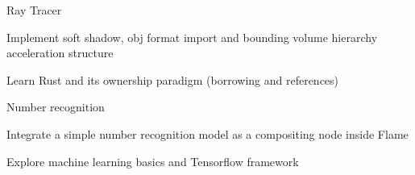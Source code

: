 




\begin{cventries}


\cvproj
{Ray Tracer} %
{ %
\begin{cvitems}
\item {Implement soft shadow, obj format import and bounding volume hierarchy acceleration structure }
\item {Learn Rust and its ownership paradigm (borrowing and references)}
\end{cvitems}
}

\cvproj
{Number recognition} %
{ %
\begin{cvitems}
\item {Integrate a simple number recognition model as a compositing node inside Flame}
\item {Explore machine learning basics and Tensorflow framework}
\end{cvitems}
}



\end{cventries}